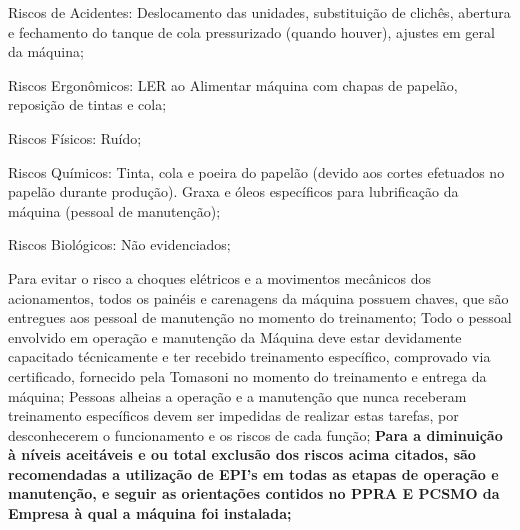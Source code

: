 \begin{typeOfRisks}
\item Riscos de Acidentes: Deslocamento das unidades, substituição de clichês, abertura e fechamento do tanque de cola pressurizado (quando houver), ajustes em geral da máquina;
\item Riscos Ergonômicos: LER ao Alimentar máquina com chapas de papelão, reposição de tintas e cola;
\item Riscos Físicos: Ruído;
\item Riscos Químicos: Tinta, cola e poeira do papelão (devido aos cortes efetuados no papelão durante produção). Graxa e
óleos específicos para lubrificação da máquina (pessoal de manutenção);
\item Riscos Biológicos: Não evidenciados;
\end{typeOfRisks}
Para evitar o risco a choques elétricos e a movimentos mecânicos dos acionamentos, todos os painéis e carenagens da
máquina possuem chaves, que são entregues aos pessoal de manutenção no momento do treinamento;
Todo o pessoal envolvido em operação e manutenção da Máquina deve estar devidamente capacitado técnicamente e ter
recebido treinamento específico, comprovado via certificado, fornecido pela Tomasoni no momento do treinamento e
entrega da máquina;
Pessoas alheias a operação e a manutenção que nunca receberam treinamento específicos devem ser impedidas de
realizar estas tarefas, por desconhecerem o funcionamento e os riscos de cada função;
\textbf{Para a diminuição à níveis aceitáveis e ou total exclusão dos riscos acima citados, são recomendadas a utilização de EPI's
em todas as etapas de operação e manutenção, e seguir as orientações contidos no PPRA E PCSMO da Empresa à qual a
máquina foi instalada;}
\vspace{20 pt}

